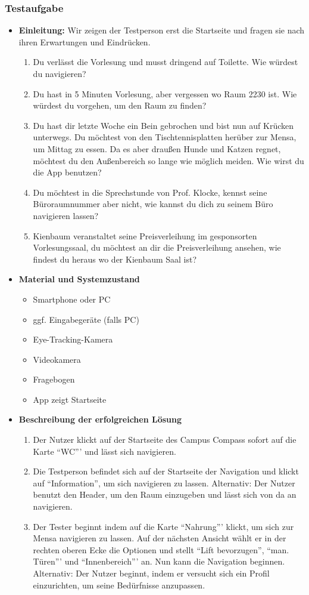 \subsubsection*{Testaufgabe}
\begin{itemize}
\item \textbf{Einleitung:} Wir zeigen der Testperson erst die Startseite und fragen sie nach ihren Erwartungen und Eindrücken.
\begin{enumerate}
\item Du verlässt die Vorlesung und musst dringend auf Toilette. Wie würdest du navigieren?
\item Du hast in 5 Minuten Vorlesung, aber vergessen wo Raum 2230 ist. Wie würdest du vorgehen, um den Raum zu finden?
\item Du hast dir letzte Woche ein Bein gebrochen und bist nun auf Krücken unterwegs. Du möchtest von den Tischtennisplatten herüber zur Mensa, um Mittag zu essen. Da es aber draußen Hunde und Katzen regnet, möchtest du den Außenbereich so lange wie möglich meiden. Wie wirst du die App benutzen?
\item Du möchtest in die Sprechstunde von Prof. Klocke, kennst seine Büroraumnummer aber nicht, wie kannst du dich zu seinem Büro navigieren lassen?
\item Kienbaum veranstaltet seine Preisverleihung im gesponsorten Vorlesungssaal, du möchtest an dir die Preisverleihung ansehen, wie findest du heraus wo der Kienbaum Saal ist?
\end{enumerate}
\item \textbf{Material und Systemzustand}
\begin{itemize}
\item Smartphone oder PC
\item ggf. Eingabegeräte (falls PC)
\item Eye-Tracking-Kamera
\item Videokamera
\item Fragebogen
\item App zeigt Startseite
\end{itemize}
\item \textbf{Beschreibung der erfolgreichen Lösung}
\begin{enumerate}
\item Der Nutzer klickt auf der Startseite des Campus Compass sofort auf die Karte "`WC"'' und lässt sich navigieren.
\item Die Testperson befindet sich auf der Startseite der Navigation und klickt auf "`Information"', um sich navigieren zu lassen.
Alternativ: Der Nutzer benutzt den Header, um den Raum einzugeben und lässt sich von da an navigieren.
\item Der Tester beginnt indem auf die Karte "`Nahrung"'' klickt, um sich zur Mensa navigieren zu lassen. Auf der nächsten Ansicht wählt er in der rechten oberen Ecke die Optionen und stellt "`Lift bevorzugen"', "`man. Türen"'' und "`Innenbereich"'' an. Nun kann die Navigation beginnen.
Alternativ: Der Nutzer beginnt, indem er versucht sich ein Profil einzurichten, um seine Bedürfnisse anzupassen.
\end{enumerate}
\end{itemize}

